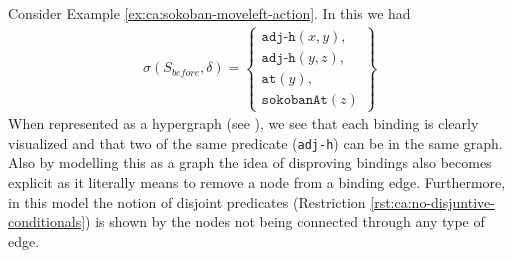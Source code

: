 \documentclass[../Master.tex]{subfiles}
\begin{document}
	
	
	
	
	
\begin{example}\label{ex:ca:sokoban-hypergraph}
	Consider Example \ref{ex:ca:sokoban-moveleft-action}. In this we had 
	\begin{align*}
		\sigma(S_{before}, \delta) =
			\left\{
			\begin{gathered}
				\texttt{adj-h}(x, y), \\
				\texttt{adj-h}(y, z), \\
				\texttt{at}(y), \\
				\texttt{sokobanAt}(z)
			\end{gathered}
			\right\}
	\end{align*}
	When represented as a hypergraph (see ),
	we see that each binding is clearly visualized and that two of the same predicate (\texttt{adj-h}) can be in the same graph.
	Also by modelling this as a graph the idea of disproving bindings also
	becomes explicit as it literally means to remove a node from a binding edge.
	Furthermore, in this model the notion of disjoint predicates (Restriction \ref{rst:ca:no-disjuntive-conditionals}) is shown by the nodes not being connected through any type of edge.
\end{example}
	
\end{document}
